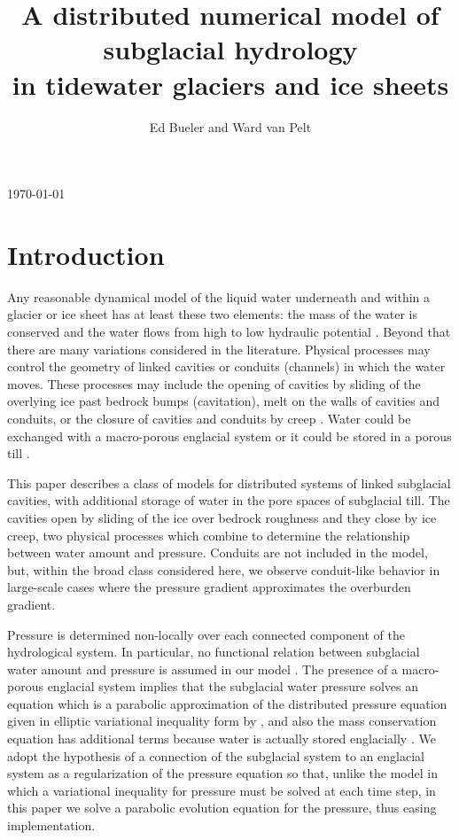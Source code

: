 \documentclass[11pt,final]{amsart}
\title[]{A distributed numerical model of subglacial hydrology \\ in tidewater glaciers and ice sheets}
\author[]{Ed Bueler and Ward van Pelt}
\begin{document}
\graphicspath{{figs/}}

\scriptsize \hfill \today \normalsize
\vspace{0.5in}

\maketitle
\thispagestyle{empty}


\section{Introduction}

Any reasonable dynamical model of the liquid water underneath and within a glacier or ice sheet has at least these two elements: the mass of the water is conserved and the water flows from high to low hydraulic potential \citep{Clarke05}.  Beyond that there are many variations considered in the literature.  Physical processes may control the geometry of linked cavities \citep{Kamb1987} or conduits (channels) \citep{Nye1976} in which the water moves.  These processes may include the opening of cavities by sliding of the overlying ice past bedrock bumps (cavitation), melt on the walls of cavities and conduits, or the closure of cavities and conduits by creep \citep{Hewitt2011}.  Water could be exchanged with a macro-porous englacial system \citep{Bartholomausetal2011,Harperetal2010} or it could be stored in a porous till \citep{Tulaczyketal2000}.

This paper describes a class of models for distributed systems of linked subglacial cavities, with additional storage of water in the pore spaces of subglacial till.  The cavities open by sliding of the ice over bedrock roughness and they close by ice creep, two physical processes which combine to determine the relationship between water amount and pressure.  Conduits are not included in the model, but, within the broad class considered here, we observe conduit-like behavior in large-scale cases where the pressure gradient approximates the overburden gradient.

Pressure is determined non-locally over each connected component of the hydrological system.  In particular, no functional relation between subglacial water amount and pressure is assumed in our model \citep[compare][]{FlowersClarke2002_theory}.  The presence of a macro-porous englacial system implies that the subglacial water pressure solves an equation which is a parabolic approximation of the distributed pressure equation given in elliptic variational inequality form by \cite{Schoofetal2012}, and also the mass conservation equation has additional terms because water is actually stored englacially \citep{Hewitt2013}.  We adopt the hypothesis of a connection of the subglacial system to an englacial system as a regularization of the pressure equation so that, unlike the \cite{Schoofetal2012} model in which a variational inequality for pressure must be solved at each time step, in this paper we solve a parabolic evolution equation for the pressure, thus easing implementation.
\end{document}
